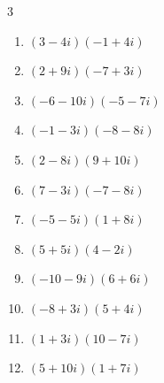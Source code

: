 \begin{multicols}{3}
\begin{enumerate}
        \phantom{$\displaystyle =-46-56i$}

  \item $\displaystyle (3-4i)(-1+4i)$

        \phantom{$\displaystyle =13+16i$}

  \item $\displaystyle (2+9i)(-7+3i)$

        \phantom{$\displaystyle =-41-57i$}

  \item $\displaystyle (-6-10i)(-5-7i)$

        \phantom{$\displaystyle =-40+92i$}

  \item $\displaystyle (-1-3i)(-8-8i)$

        \phantom{$\displaystyle =-16+32i$}

  \item $\displaystyle (2-8i)(9+10i)$

        \phantom{$\displaystyle =98-52i$}

  \item $\displaystyle (7-3i)(-7-8i)$

        \phantom{$\displaystyle =-73-35i$}

  \item $\displaystyle (-5-5i)(1+8i)$

        \phantom{$\displaystyle =35-45i$}

  \item $\displaystyle (5+5i)(4-2i)$

        \phantom{$\displaystyle =30+10i$}

\columnbreak %

\resetques

  \item $\displaystyle (-10-9i)(6+6i)$

        \phantom{$\displaystyle =-6-114i$}

  \item $\displaystyle (-8+3i)(5+4i)$

        \phantom{$\displaystyle =-52-17i$}

  \item $\displaystyle (1+3i)(10-7i)$

        \phantom{$\displaystyle =31+23i$}

  \item $\displaystyle (5+10i)(1+7i)$

        \phantom{$\displaystyle =-65+45i$}


\end{enumerate}
\end{multicols}
